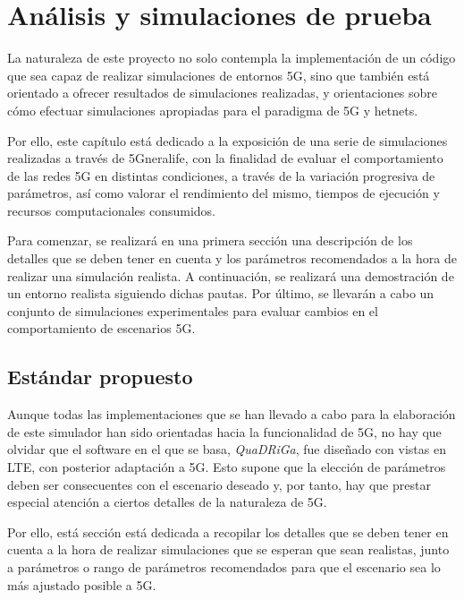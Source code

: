 \chapter{Análisis y simulaciones de prueba}\label{cap.pruebas}

La naturaleza de este proyecto no solo contempla la implementación de un código que sea capaz de realizar simulaciones de entornos 5G, sino que también está orientado a ofrecer resultados de simulaciones realizadas, y orientaciones sobre cómo efectuar simulaciones apropiadas para el paradigma de 5G y \acs{hetnet}s.

Por ello, este capítulo está dedicado a la exposición de una serie de simulaciones realizadas a través de 5Gneralife, con la finalidad de evaluar el comportamiento de las redes 5G en distintas condiciones, a través de la variación progresiva de parámetros, así como valorar el rendimiento del mismo, tiempos de ejecución y recursos computacionales consumidos.

Para comenzar, se realizará en una primera sección una descripción de los detalles que se deben tener en cuenta y los parámetros recomendados a la hora de realizar una simulación realista. A continuación, se realizará una demostración de un entorno realista siguiendo dichas pautas. Por último, se llevarán a cabo un conjunto de simulaciones experimentales para evaluar cambios en el comportamiento de escenarios 5G.

\section{Estándar propuesto}

Aunque todas las implementaciones que se han llevado a cabo para la elaboración de este simulador han sido orientadas hacia la funcionalidad de 5G, no hay que olvidar que el software en el que se basa, \textit{QuaDRiGa}, fue diseñado con vistas en LTE, con posterior adaptación a 5G. Esto supone que la elección de parámetros deben ser consecuentes con el escenario deseado y, por tanto, hay que prestar especial atención a ciertos detalles de la naturaleza de 5G.

Por ello, está sección está dedicada a recopilar los detalles que se deben tener en cuenta a la hora de realizar simulaciones que se esperan que sean realistas, junto a parámetros o rango de parámetros recomendados para que el escenario sea lo más ajustado posible a 5G.

